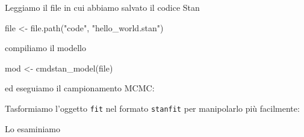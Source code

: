 \documentclass[
  10pt,
  italian,
  a4paper,
  extrafontsizes,onecolumn,openright
  ]{memoir}
\newenvironment{Shaded}{\begin{snugshade}}{\end{snugshade}}
\newcommand{\AttributeTok}[1]{\textcolor[rgb]{0.77,0.63,0.00}{#1}}
\newcommand{\CommentTok}[1]{\textcolor[rgb]{0.56,0.35,0.01}{\textit{#1}}}
\newcommand{\DecValTok}[1]{\textcolor[rgb]{0.00,0.00,0.81}{#1}}
\newcommand{\FunctionTok}[1]{\textcolor[rgb]{0.00,0.00,0.00}{#1}}
\newcommand{\NormalTok}[1]{#1}
\newcommand{\OtherTok}[1]{\textcolor[rgb]{0.56,0.35,0.01}{#1}}
\newcommand{\SpecialCharTok}[1]{\textcolor[rgb]{0.00,0.00,0.00}{#1}}
\newcommand{\StringTok}[1]{\textcolor[rgb]{0.31,0.60,0.02}{#1}}
\begin{document}
Leggiamo il file in cui abbiamo salvato il codice Stan

\begin{Shaded}
\begin{Highlighting}[]
\NormalTok{file }\OtherTok{\textless{}{-}} \FunctionTok{file.path}\NormalTok{(}\StringTok{"code"}\NormalTok{, }\StringTok{"hello\_world.stan"}\NormalTok{)}
\end{Highlighting}
\end{Shaded}

\noindent
compiliamo il modello

\begin{Shaded}
\begin{Highlighting}[]
\NormalTok{mod }\OtherTok{\textless{}{-}} \FunctionTok{cmdstan\_model}\NormalTok{(file)}
\end{Highlighting}
\end{Shaded}

\noindent
ed eseguiamo il campionamento MCMC:

\begin{Shaded}
\end{Shaded}

Tasformiamo l'oggetto \texttt{fit} nel formato \texttt{stanfit} per manipolarlo più facilmente:

\begin{Shaded}
\end{Shaded}

\noindent
Lo esaminiamo

\begin{Shaded}
\end{Shaded}
\end{document}
